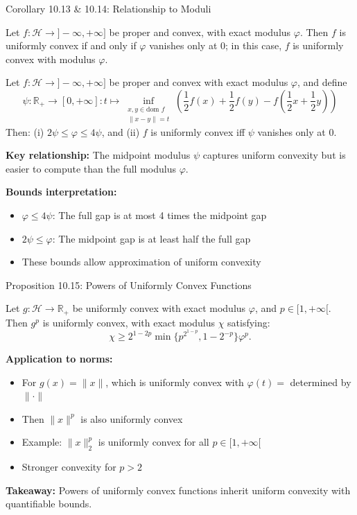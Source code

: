 \documentclass[aspectratio=169,10pt]{beamer}
\begin{document}
\begin{frame}[allowframebreaks]{Corollary 10.13 \& 10.14: Relationship to Moduli}
\begin{corollary}[10.13]
Let $f: \mathcal{H} \to ]-\infty, +\infty]$ be proper and convex, with exact modulus $\varphi$. Then $f$ is uniformly convex if and only if $\varphi$ vanishes only at 0; in this case, $f$ is uniformly convex with modulus $\varphi$.
\end{corollary}

\begin{proposition}[10.14]
Let $f: \mathcal{H} \to ]-\infty, +\infty]$ be proper and convex with exact modulus $\varphi$, and define
\[
\psi: \mathbb{R}_+ \to [0, +\infty] : t \mapsto \inf_{\substack{x, y \in \text{dom } f \\ \|x-y\|=t}} \left( \frac{1}{2}f(x) + \frac{1}{2}f(y) - f\left(\frac{1}{2}x + \frac{1}{2}y\right) \right)
\]
Then: (i) $2\psi \leq \varphi \leq 4\psi$, and (ii) $f$ is uniformly convex iff $\psi$ vanishes only at 0.
\end{proposition}

\framebreak

\textbf{Key relationship:} The midpoint modulus $\psi$ captures uniform convexity but is easier to compute than the full modulus $\varphi$.

\textbf{Bounds interpretation:}
\begin{itemize}
\item $\varphi \leq 4\psi$: The full gap is at most 4 times the midpoint gap
\item $2\psi \leq \varphi$: The midpoint gap is at least half the full gap
\item These bounds allow approximation of uniform convexity
\end{itemize}
\end{frame}

\begin{frame}{Proposition 10.15: Powers of Uniformly Convex Functions}
\begin{proposition}
Let $g: \mathcal{H} \to \mathbb{R}_+$ be uniformly convex with exact modulus $\varphi$, and $p \in [1, +\infty[$. Then $g^p$ is uniformly convex, with exact modulus $\chi$ satisfying:
\[
\chi \geq 2^{1-2p} \min\{p^{2^{1-p}}, 1-2^{-p}\} \varphi^p.
\]
\end{proposition}

\textbf{Application to norms:}
\begin{itemize}
\item For $g(x) = \|x\|$, which is uniformly convex with $\varphi(t) = $ determined by $\|\cdot\|$
\item Then $\|x\|^p$ is also uniformly convex
\item Example: $\|x\|_2^p$ is uniformly convex for all $p \in [1, +\infty[$
\item Stronger convexity for $p > 2$
\end{itemize}

\textbf{Takeaway:} Powers of uniformly convex functions inherit uniform convexity with quantifiable bounds.
\end{frame}
\end{document}
